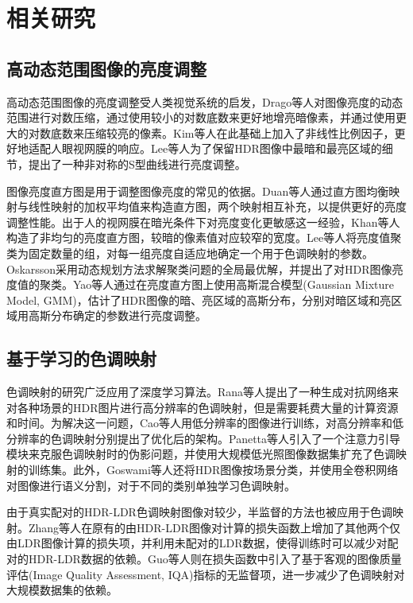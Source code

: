 \documentclass[
    type = master, %
    degree = academic,        %
    decl-page,  %
  ]{njuthesis}
\begin{document}
\section{相关研究 }
\subsection{高动态范围图像的亮度调整}
高动态范围图像的亮度调整受人类视觉系统的启发，Drago等人\cite{TM6}对图像亮度的动态范围进行对数压缩，通过使用较小的对数底数来更好地增亮暗像素，并通过使用更大的对数底数来压缩较亮的像素。Kim等人\cite{TM7}在此基础上加入了非线性比例因子，更好地适配人眼视网膜的响应。Lee等人\cite{TM8}为了保留HDR图像中最暗和最亮区域的细节，提出了一种非对称的S型曲线进行亮度调整。

图像亮度直方图是用于调整图像亮度的常见的依据。Duan等人\cite{TM34}通过直方图均衡映射与线性映射的加权平均值来构造直方图，两个映射相互补充，以提供更好的亮度调整性能。出于人的视网膜在暗光条件下对亮度变化更敏感这一经验，Khan等人\cite{TM37}构造了非均匀的亮度直方图，较暗的像素值对应较窄的宽度。Lee等人\cite{TM9}将亮度值聚类为固定数量的组，对每一组亮度自适应地确定一个用于色调映射的参数。Oskarsson\cite{TM10}采用动态规划方法求解聚类问题的全局最优解，并提出了对HDR图像亮度值的聚类。Yao等人\cite{TM12}通过在亮度直方图上使用高斯混合模型(Gaussian Mixture Model, GMM)，估计了HDR图像的暗、亮区域的高斯分布，分别对暗区域和亮区域用高斯分布确定的参数进行亮度调整。


\subsection{基于学习的色调映射}
色调映射的研究广泛应用了深度学习算法。Rana等人\cite{TM13}提出了一种生成对抗网络来对各种场景的HDR图片进行高分辨率的色调映射，但是需要耗费大量的计算资源和时间。为解决这一问题，Cao等人\cite{TM14}用低分辨率的图像进行训练，对高分辨率和低分辨率的色调映射分别提出了优化后的架构。Panetta等人\cite{TM15}引入了一个注意力引导模块来克服色调映射时的伪影问题，并使用大规模低光照图像数据集扩充了色调映射的训练集。此外，Goswami等人\cite{TM18}还将HDR图像按场景分类，并使用全卷积网络对图像进行语义分割，对于不同的类别单独学习色调映射。

由于真实配对的HDR-LDR色调映射图像对较少，半监督的方法也被应用于色调映射。Zhang等人\cite{TM16}在原有的由HDR-LDR图像对计算的损失函数上增加了其他两个仅由LDR图像计算的损失项，并利用未配对的LDR数据，使得训练时可以减少对配对的HDR-LDR数据的依赖。Guo等人\cite{TM17}则在损失函数中引入了基于客观的图像质量评估(Image Quality Assessment, IQA)指标的无监督项，进一步减少了色调映射对大规模数据集的依赖。
\end{document}
